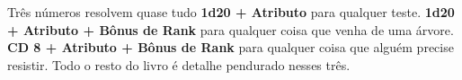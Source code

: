 \documentclass{moshoku}
\begin{document}
\begin{aviso}{Três números resolvem quase tudo}
    \textbf{1d20 + Atributo} para qualquer teste. \textbf{1d20 + Atributo + Bônus de
    Rank} para qualquer coisa que venha de uma árvore. \textbf{CD 8 + Atributo + Bônus de
    Rank} para qualquer coisa que alguém precise resistir. Todo o resto do livro é
    detalhe pendurado nesses três.
\end{aviso}

\tableofcontents

\mainmatter







\appendix

\end{document}
